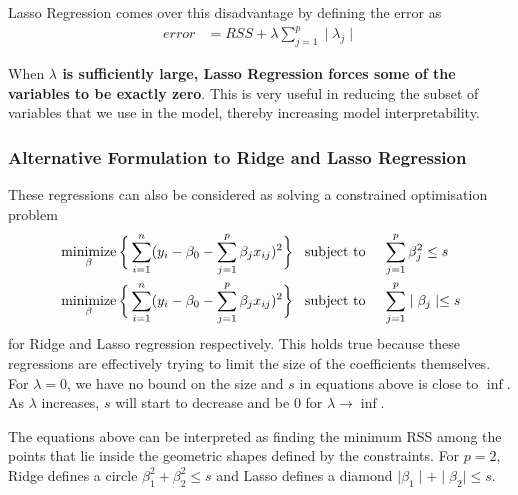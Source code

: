 \documentclass[11pt, a4paper]{article}
\DeclareMathOperator*{\minimize}{minimize}
\begin{document}
    Lasso Regression comes over this disadvantage by defining the error as
    \begin{align*}
        error &= RSS + \lambda \sum_{j=1}^{p}\mid \lambda_{j} \mid
    \end{align*}

    When \textbf{$\lambda$ is sufficiently large, Lasso Regression forces some of the variables to be exactly zero}. This is very useful in reducing the subset of variables that we use in the model, thereby increasing model interpretability.


    \subsubsection{Alternative Formulation to Ridge and Lasso Regression}
    These regressions can also be considered as solving a constrained optimisation problem
    \begin{align*}
        &\minimize_{\beta}  \bigg\{\sum_{i=1}^{n} (y_{i} - \beta_{0} - \sum_{j=1}^{p}\beta_{j}x_{ij})^{2} \bigg\} \text{\;\;\;subject to\;} &&\sum_{j=1}^{p}\beta_{j}^{2} \leq s \\
        &\minimize_{\beta}  \bigg\{\sum_{i=1}^{n} (y_{i} - \beta_{0} - \sum_{j=1}^{p}\beta_{j}x_{ij})^{2} \bigg\} \text{\;\;\;subject to\;} &&\sum_{j=1}^{p}\mid \beta_{j} \mid \leq s
    \end{align*}
    for Ridge and Lasso regression respectively. This holds true because these regressions are effectively trying to limit the size of the coefficients themselves. For $\lambda = 0$, we have no bound on the size and $s$ in equations above is close to $\inf$. As $\lambda$ increases, $s$ will start to decrease and be $0$ for $\lambda \to \inf$. \newline

    The equations above can be interpreted as finding the minimum RSS among the points that lie inside the geometric shapes defined by the constraints. For $p = 2$, Ridge defines a circle $\beta_{1}^{2} + \beta_{2}^{2} \leq s$ and Lasso defines a diamond $\mid \beta_{1} \mid + \mid \beta_{2} \mid \leq s$.

    
\end{document}
